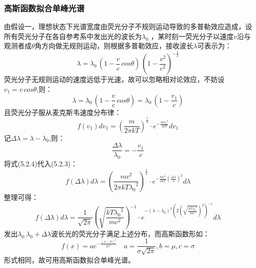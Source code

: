 \documentclass{article}
\numberwithin{equation}{subsection}
\begin{document}
\subsubsection{高斯函数拟合单峰光谱}
由假设一，理想状态下光谱宽度由荧光分子不规则运动导致的多普勒效应造成，设所有荧光分子在各自参考系中发出光的波长为$\lambda_{0}$ ，某时刻一荧光分子以速度$v$沿与观测者成$\theta$角方向做无规则运动，则根据多普勒效应，接收波长$\lambda$可表示为：
\begin{equation}
\lambda=\lambda_{0}\,(1-\frac{v}{c}\,cos\theta)\,{(1-\frac{v^2}{c^2})}^{-\frac{1}{2}} 
\end{equation}
荧光分子无规则运动的速度远低于光速，故可以忽略相对论效应，不妨设$v_1=v\,cos\theta$,则：
\begin{equation}
\lambda=\lambda_{0}\,(1-\frac{v}{c}\,cos\theta)=\lambda_{0}\,(1-\frac{v_1}{c})
\end{equation}
且荧光分子服从麦克斯韦速度分布律：
\begin{equation}
f\left(v_{1}\right) d v_{1}=\left(\frac{m}{2 \pi k{T}}\right)^{\frac{1}{2}} \cdot e^{-\frac{m {v_{1}}^2}{2kT}} d v_{1}
\end{equation}
记$\Delta\lambda=\lambda-\lambda_{0}$,则：
\begin{equation}
\frac{\Delta \lambda}{\lambda_{0}}=-\frac{v_{1}}{c}
\end{equation}
将式(5.2.4)代入(5.2.3)：
\begin{equation}
f\left(\Delta\lambda\right) d \lambda=\left(\frac{m c^2}{2 \pi k{T} {\lambda_{0}}^2}\right)^{\frac{1}{2}} \cdot e^{-\frac{m {c}^2}{2kT}{\left(\frac{\Delta\lambda}{\lambda}\right)}^2} d \lambda
\end{equation}
整理可得：
\begin{equation}
f\left(\Delta\lambda\right) d \lambda=\frac{1}{\sqrt{2 \pi}} \left(\sqrt{ \frac{k{T} {\lambda_{0}}^2}{m c^2}}\right)^{-1} \cdot e^{-(\lambda-\lambda_{0})^2 \left(2 {\left(\sqrt{ \frac{k{T} {\lambda_{0}}^2}{m c^2}}\right)}^2\right)^{-1}}d \lambda
\end{equation}
发出$\lambda_{0}~\lambda_{0}+\Delta\lambda$波长光的荧光分子满足上述分布，而高斯函数形如：
\begin{equation}
f(x)=a e^{-\frac{(x-b)^{2}}{2 c^{2}}}\quad a=\frac{1}{\sigma \sqrt{2 \pi}}, b=\mu, c=\sigma    
\end{equation}
形式相同，故可用高斯函数拟合单峰光谱。
\end{document}
